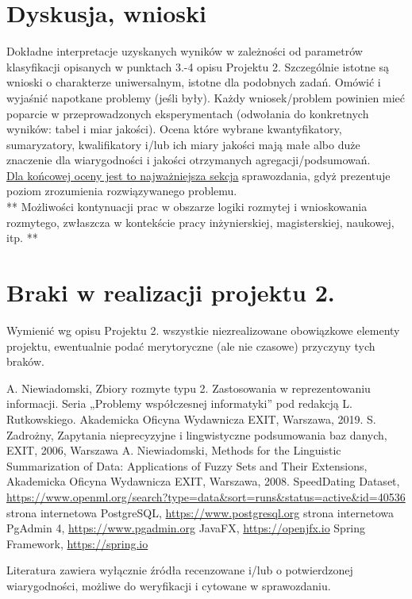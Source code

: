 \documentclass{classrep}
\begin{document}


\section{Dyskusja, wnioski}
Dokładne interpretacje uzyskanych wyników w zależności od parametrów klasyfikacji
opisanych w punktach 3.-4 opisu Projektu 2. 
Szczególnie istotne są wnioski o charakterze uniwersalnym, istotne dla podobnych zadań. 
Omówić i wyjaśnić napotkane problemy (jeśli były). Każdy wniosek/problem powinien mieć poparcie
w przeprowadzonych eksperymentach (odwołania do konkretnych wyników: tabel i miar
jakości). Ocena które wybrane kwantyfikatory, sumaryzatory, kwalifikatory i/lub ich
miary jakości mają małe albo duże znaczenie dla wiarygodności i jakości otrzymanych
agregacji/podsumowań.  \\
\underline{Dla końcowej oceny jest to najważniejsza sekcja} sprawozdania, gdyż prezentuje poziom
zrozumienia rozwiązywanego problemu.\\

** Możliwości kontynuacji prac w obszarze logiki rozmytej i wnioskowania rozmytego, zwłaszcza w kontekście pracy inżynierskiej,
magisterskiej, naukowej, itp. **\\



\section{Braki w realizacji projektu 2.}
Wymienić wg opisu Projektu 2. wszystkie niezrealizowane obowiązkowe elementy projektu, ewentualnie
podać merytoryczne (ale nie czasowe) przyczyny tych braków. 


\begin{thebibliography}{99}
  A. Niewiadomski, Zbiory rozmyte typu 2. Zastosowania w reprezentowaniu informacji.  Seria „Problemy współczesnej informatyki” pod redakcją L. Rutkowskiego. Akademicka Oficyna Wydawnicza EXIT, Warszawa, 2019.
 S. Zadrożny, Zapytania nieprecyzyjne i lingwistyczne podsumowania baz danych, EXIT, 2006, Warszawa
 A. Niewiadomski, Methods for the Linguistic Summarization of Data: Applications of Fuzzy Sets and Their Extensions, Akademicka Oficyna Wydawnicza EXIT, Warszawa, 2008.
 SpeedDating Dataset, \url{https://www.openml.org/search?type=data&sort=runs&status=active&id=40536}
 strona internetowa PostgreSQL, \url{https://www.postgresql.org}
 strona internetowa PgAdmin 4, \url{https://www.pgadmin.org}
 JavaFX, \url{https://openjfx.io}
 Spring Framework, \url{https://spring.io}

\end{thebibliography}

Literatura zawiera wyłącznie źródła recenzowane i/lub o potwierdzonej wiarygodności,
możliwe do weryfikacji i cytowane w sprawozdaniu. 
\end{document}
